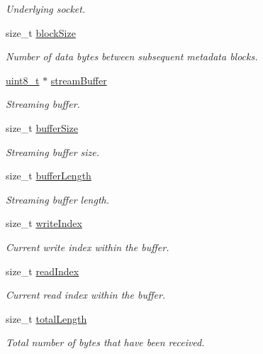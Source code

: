 \begin{DoxyCompactItemize}
\begin{DoxyCompactList}\small\item\em Underlying socket. \end{DoxyCompactList}\item 
size\+\_\+t \hyperlink{structIcecastClientContext_a2efbe1b70c31245ba3305b8371a53fd5}{block\+Size}
\begin{DoxyCompactList}\small\item\em Number of data bytes between subsequent metadata blocks. \end{DoxyCompactList}\item 
\hyperlink{stdint_8h_aba7bc1797add20fe3efdf37ced1182c5}{uint8\+\_\+t} $\ast$ \hyperlink{structIcecastClientContext_aa4f023d844d1886ad8e38864c4dba447}{stream\+Buffer}
\begin{DoxyCompactList}\small\item\em Streaming buffer. \end{DoxyCompactList}\item 
size\+\_\+t \hyperlink{structIcecastClientContext_aa5397800dc648f784e4b120e962d6632}{buffer\+Size}
\begin{DoxyCompactList}\small\item\em Streaming buffer size. \end{DoxyCompactList}\item 
size\+\_\+t \hyperlink{structIcecastClientContext_a4afdc5c305afb3f928fa7e6932832949}{buffer\+Length}
\begin{DoxyCompactList}\small\item\em Streaming buffer length. \end{DoxyCompactList}\item 
size\+\_\+t \hyperlink{structIcecastClientContext_aa437385bcf8e7e12307da9d69ef2765a}{write\+Index}
\begin{DoxyCompactList}\small\item\em Current write index within the buffer. \end{DoxyCompactList}\item 
size\+\_\+t \hyperlink{structIcecastClientContext_a491b0ef46c2747c4ef269603df92b208}{read\+Index}
\begin{DoxyCompactList}\small\item\em Current read index within the buffer. \end{DoxyCompactList}\item 
size\+\_\+t \hyperlink{structIcecastClientContext_a743e7a8432fedd8a4e301276708d7420}{total\+Length}
\begin{DoxyCompactList}\small\item\em Total number of bytes that have been received. \end{DoxyCompactList}\item 

\end{DoxyCompactItemize}
